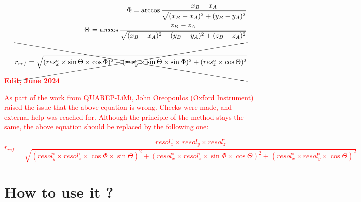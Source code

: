 \documentclass[a4paper, 11pt]{report}%
\begin{document}
\begin{enumerate*}
	\begin{eqnarray}
		\Phi=\arccos\frac{x_{B}-x_{A}}{\sqrt{(x_{B}-x_{A})^2+(y_{B}-y_{A})^2}}\label{eqn:gcoar-phi}\\
		\Theta=\arccos\frac{z_{B}-z_{A}}{\sqrt{(x_{B}-x_{A})^2+(y_{B}-y_{A})^2+(z_{B}-z_{A})^2}}\label{eqn:gcoar-theta}\\
		\xcancel{r_{ref}=\sqrt{(res^\circ_{x}\times\sin\Theta\times\cos\Phi )^2+(res^\circ_{y}\times\sin\Theta\times\sin\Phi)^2+(res^\circ_{z}\times\cos\Theta)^2}\label{eqn:gcoar-refDist}}
	\end{eqnarray}
	
\end{enumerate*}

\textbf{\textcolor{red}{Edit, June 2024}}
\textcolor{red}{As part of the work from QUAREP-LiMi, John Oreopoulos (Oxford Instrument) raised the issue that the above equation is wrong. Checks were made, and external help was reached for. Although the principle of the method stays the same, the above equation should be replaced by the following one:
\begin{ssmall}
	\begin{equation}
   		 r_{ref}=\frac{resol^\circ_{x}\times resol^\circ_{y}\times resol^\circ_{z}}{\sqrt{(resol^\circ_{y} \times resol^\circ_{z} \times\cos\Phi\times\sin\Theta)^2+(resol^\circ_{x}\times resol^\circ_{z} \times\sin\Phi\times\cos\Theta)^2+(resol^\circ_{x}\times resol^\circ_{y} \times\cos\Theta)^2}}
	\end{equation}
\end{ssmall}
}

\section{How to use it ?}
\label{sec:gcoar-how}
\end{document}
